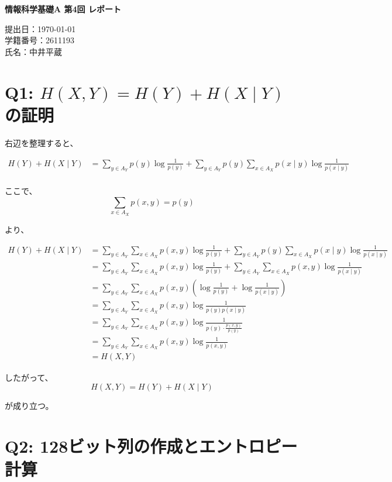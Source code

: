 \documentclass[11pt,a4paper]{jlreq}
\begin{document}
\begin{center}
{\LARGE \textbf{情報科学基礎A 第4回 レポート}}
\end{center}
\vspace{1em}

\begin{flushright}
提出日：\today \\
学籍番号：2611193 \\
氏名：中井平蔵
\end{flushright}

\section*{Q1: \boldmath$H(X,Y)=H(Y)+H(X\mid Y)$\unboldmath の証明}

右辺を整理すると、

\begin{align*}
H(Y)+H(X\mid Y)
&=\sum_{y\in A_Y} p(y)\log\frac{1}{p(y)}
 +\sum_{y\in A_Y}p(y)\sum_{x\in A_X}p(x\mid y)\log\frac{1}{p(x\mid y)}\\
\end{align*}

ここで、
\[
\sum_{x\in A_X}p(x,y)=p(y)
\]

より、

\begin{align*}
H(Y)+H(X\mid Y)
&=\sum_{y\in A_Y}\sum_{x\in A_X}p(x,y)\log\frac{1}{p(y)}
 +\sum_{y\in A_Y}p(y)\sum_{x\in A_X}p(x\mid y)\log\frac{1}{p(x\mid y)}\\
&=\sum_{y\in A_Y}\sum_{x\in A_X} p(x,y)\log\frac{1}{p(y)}
 +\sum_{y\in A_Y}\sum_{x\in A_X} p(x,y)\log\frac{1}{p(x\mid y)}\\
&=\sum_{y\in A_Y}\sum_{x\in A_X} p(x,y)\left(\log\frac{1}{p(y)}+\log\frac{1}{p(x\mid y)}\right)\\
&=\sum_{y\in A_Y}\sum_{x\in A_X} p(x,y)\log\frac{1}{p(y)p(x\mid y)}\\
&=\sum_{y\in A_Y}\sum_{x\in A_X} p(x,y)\log\frac{1}{p(y)\cdot\frac{p(x,y)}{p(y)}}\\
&=\sum_{y\in A_Y}\sum_{x\in A_X} p(x,y)\log\frac{1}{p(x,y)}\\
&=H(X,Y)
\end{align*}

したがって、
\[
H(X,Y)=H(Y)+H(X\mid Y)
\]

が成り立つ。

\section*{Q2: 128ビット列の作成とエントロピー計算}
\end{document}
